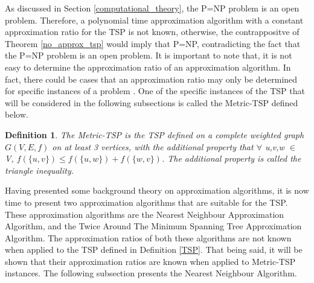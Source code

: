 \documentclass[12pt]{article}
\newtheorem{definition}{Definition}[subsection]
\numberwithin{equation}{subsection}
\numberwithin{table}{subsection}
\numberwithin{algorithm}{subsection}
\begin{document}
As discussed in Section \ref{computational_theory}, the P=NP problem is an open problem. Therefore, a polynomial time approximation algorithm with a constant approximation ratio for the TSP is not known, otherwise, the contrappositve of Theorem \ref{no_approx_tsp} would imply that P=NP, contradicting the fact that the P=NP problem is an open problem. It is important to note that, it is not easy to determine the approximation ratio of an approximation algorithm. In fact, there could be cases that an approximation ratio may only be determined for specific instances of a problem \cite{cormen_leiserson_rivest_stein}. One of the specific instances of the TSP that will be considered in the following subsections is called the Metric-TSP defined below.
\begin{definition}
\label{Metric-TSP}
The Metric-TSP is the TSP defined on a complete weighted graph $G(V,E,f)$ on at least 3 vertices, with the additional property that $\forall$ u,v,w $\in$ V, $f(\{u,v\}) \leq f(\{u,w\}) + f(\{w,v\})$. The additional property is called the triangle inequality. {}
\end{definition}
 Having presented some background theory on approximation algorithms, it is now time to present two approximation algorithms that are suitable for the TSP. These approximation algorithms are the Nearest Neighbour Approximation Algorithm, and the Twice Around The Minimum Spanning Tree Approximation Algorithm. The approximation ratios of both these algorithms are not known when applied to the TSP defined in Definition \ref{TSP}. That being said, it will be shown that their approximation ratios are known when applied to Metric-TSP instances. The following subsection presents the Nearest Neighbour Algorithm.
\end{document}
